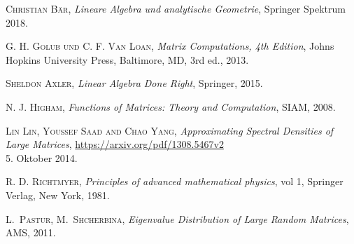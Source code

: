 
\begin{thebibliography}{56}

    \textsc{Christian Bär},
    \textit{Lineare Algebra und analytische Geometrie},
    Springer Spektrum
    2018.

    \textsc{G. H. Golub und C. F. Van Loan},
    \textit{Matrix Computations, 4th Edition},
    Johns Hopkins University Press,
    Baltimore, MD, 3rd ed.,
    2013.

    \textsc{Sheldon Axler},
    \textit{Linear Algebra Done Right},
    Springer,
    2015.

    \textsc{N. J. Higham},
    \textit{Functions of Matrices: Theory and Computation},
    SIAM,
    2008.

    \textsc{Lin Lin, Youssef Saad and Chao Yang},
    \textit{Approximating Spectral Densities of Large Matrices},
    \url{https://arxiv.org/pdf/1308.5467v2}\\
    5. Oktober 2014.

    \textsc{R. D. Richtmyer},
    \textit{Principles of advanced mathematical physics},
    vol 1, Springer Verlag,
    New York,
    1981.

    \textsc{L.~Pastur, M.~Shcherbina},
    \textit{Eigenvalue Distribution of Large Random Matrices},
    AMS,
    2011.

\end{thebibliography}